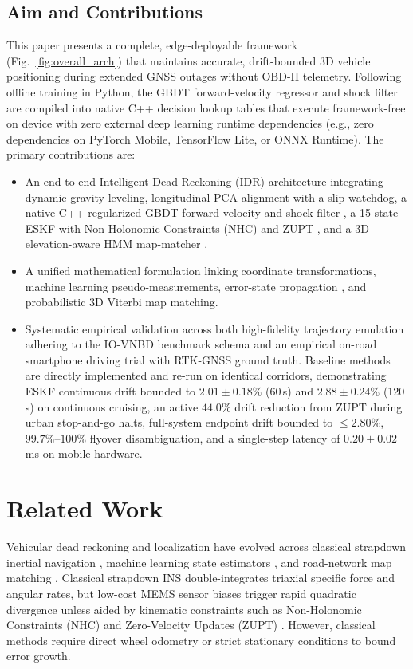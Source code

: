 \documentclass[conference]{IEEEtran}
\begin{document}
\subsection{Aim and Contributions}
This paper presents a complete, edge-deployable framework (Fig.~\ref{fig:overall_arch}) that maintains accurate, drift-bounded 3D vehicle positioning during extended GNSS outages without OBD-II telemetry. Following offline training in Python, the GBDT forward-velocity regressor and shock filter are compiled into native C++ decision lookup tables that execute framework-free on device with zero external deep learning runtime dependencies (e.g., zero dependencies on PyTorch Mobile, TensorFlow Lite, or ONNX Runtime). The primary contributions are:
\begin{itemize}
\item An end-to-end Intelligent Dead Reckoning (IDR) architecture integrating dynamic gravity leveling, longitudinal PCA alignment with a slip watchdog, a native C++ regularized GBDT forward-velocity and shock filter \cite{friedman2001}, a 15-state ESKF with Non-Holonomic Constraints (NHC) \cite{dissanayake2001} and ZUPT \cite{foxlin2005}, and a 3D elevation-aware HMM map-matcher \cite{newson2009}.
\item A unified mathematical formulation linking coordinate transformations, machine learning pseudo-measurements, error-state propagation \cite{sola2017}, and probabilistic 3D Viterbi map matching.
\item Systematic empirical validation across both high-fidelity trajectory emulation adhering to the IO-VNBD benchmark schema \cite{onyekpe2021} and an empirical on-road smartphone driving trial with RTK-GNSS ground truth. Baseline methods \cite{dissanayake2001, brossard2020} are directly implemented and re-run on identical corridors, demonstrating ESKF continuous drift bounded to $2.01 \pm 0.18\%$ (60\,s) and $2.88 \pm 0.24\%$ (120\,s) on continuous cruising, an active $44.0\%$ drift reduction from ZUPT during urban stop-and-go halts, full-system endpoint drift bounded to $\le 2.80\%$, $99.7\%$--$100\%$ flyover disambiguation, and a single-step latency of $0.20 \pm 0.02$\,ms on mobile hardware.
\end{itemize}

\section{Related Work}

Vehicular dead reckoning and localization have evolved across classical strapdown inertial navigation \cite{dissanayake2001, foxlin2005}, machine learning state estimators \cite{brossard2020, lawal2024, qian2025, mamun2026}, and road-network map matching \cite{newson2009, javed2024, sundar2026}. Classical strapdown INS double-integrates triaxial specific force and angular rates, but low-cost MEMS sensor biases trigger rapid quadratic divergence unless aided by kinematic constraints such as Non-Holonomic Constraints (NHC) \cite{dissanayake2001} and Zero-Velocity Updates (ZUPT) \cite{foxlin2005}. However, classical methods require direct wheel odometry or strict stationary conditions to bound error growth.
\end{document}
